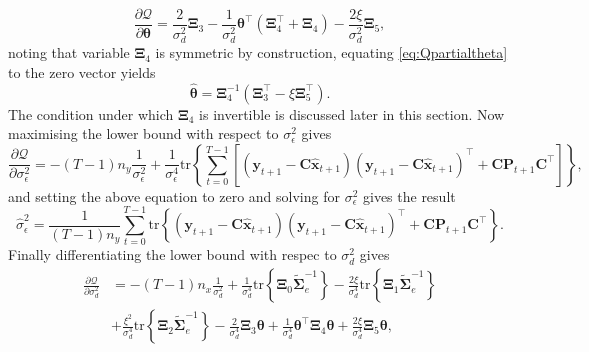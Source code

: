 \documentclass[]{article}
\begin{document}
\begin{equation}\label{eq:Qpartialtheta}
 \frac{\partial \mathcal Q}{\partial \boldsymbol\theta}=\frac{2}{\sigma_d^2}\boldsymbol\Xi_3-\frac{1}{\sigma_d^2}\boldsymbol\theta^\top(\boldsymbol\Xi_4^\top+\boldsymbol\Xi_4)-\frac{2\xi}{\sigma_d^2}\boldsymbol\Xi_5,
\end{equation}
noting that variable $\boldsymbol\Xi_4$ is symmetric by construction, equating \eqref{eq:Qpartialtheta} to the zero vector yields
\begin{equation}\label{eq:thetahat}
 \hat{\boldsymbol \theta}=\boldsymbol\Xi_4^{-1}\left(\boldsymbol\Xi_3^\top-\xi\boldsymbol\Xi_5^\top \right).
\end{equation}
The condition under which $\boldsymbol\Xi_4$ is invertible is discussed later in this section. Now maximising the lower bound with respect to $\sigma_{\epsilon}^2$ gives
\begin{equation}
  \frac{\partial \mathcal Q}{\partial \sigma_{\epsilon}^2}=-(T-1)n_y\frac{1}{\sigma_{\epsilon}^2}+\frac{1}{\sigma_{\epsilon}^4}\mathrm{tr}\left\lbrace\sum_{t=0}^{T-1}\left[ (\mathbf y_{t+1}-\mathbf C\mathbf{\hat{x}}_{t+1}) (\mathbf y_{t+1}-\mathbf C\mathbf{\hat{x}}_{t+1})^\top+\mathbf C \mathbf P_{t+1}\mathbf C^\top\right] \right\rbrace,
\end{equation}
and setting the above equation to zero and solving for $\sigma_{\epsilon}^2$ gives the result
\begin{equation}\label{eq:sigmaepsilonhat}
 \hat{\sigma}_{\epsilon}^2=\frac{1}{(T-1)n_y}\sum_{t=0}^{T-1}\mathrm{tr}\left\lbrace (\mathbf y_{t+1}-\mathbf C\mathbf{\hat{x}}_{t+1}) (\mathbf y_{t+1}-\mathbf C\mathbf{\hat{x}}_{t+1})^\top+\mathbf C \mathbf P_{t+1}\mathbf C^\top \right\rbrace.
\end{equation}
Finally differentiating the lower bound with respec to $\sigma_d^2$ gives
\begin{align}
 \frac{\partial \mathcal Q}{\partial \sigma_d^2}&= -(T-1)n_x\frac{1}{\sigma_d^2}+\frac{1}{\sigma_d^4}\mathrm{tr}\left\lbrace \boldsymbol\Xi_0 \tilde{\boldsymbol\Sigma}_e^{-1}\right\rbrace-\frac{2\xi}{\sigma_d^4} \mathrm{tr}\left\lbrace \boldsymbol\Xi_1 \tilde{\boldsymbol\Sigma}_e^{-1}\right\rbrace  \nonumber \\
&+\frac{\xi^2}{\sigma_d^4}\mathrm{tr} \left\lbrace\boldsymbol\Xi_2\tilde{\boldsymbol\Sigma}_e^{-1} \right\rbrace-\frac{2}{\sigma_d^4}\boldsymbol\Xi_3\boldsymbol\theta +\frac{1}{\sigma_d^4}\boldsymbol\theta^\top \boldsymbol\Xi_4\boldsymbol\theta+\frac{2\xi}{\sigma_d^4} \boldsymbol\Xi_5 \boldsymbol\theta,
\end{align}
\end{document}

